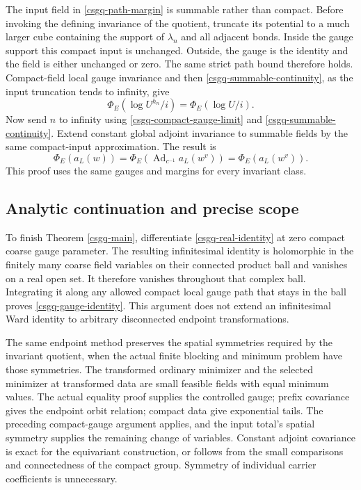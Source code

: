 The input field in \eqref{csgq-path-margin} is summable rather than
compact. Before invoking the defining invariance of the quotient,
truncate its potential to a much larger cube containing the support of
$\lambda_n$ and all adjacent bonds. Inside the gauge support this
compact input is unchanged. Outside, the gauge is the identity and
the field is either unchanged or zero. The same strict path bound
therefore holds. Compact-field local gauge invariance and then
\eqref{csgq-summable-continuity}, as the input truncation tends to
infinity, give
\begin{equation}
              \Phi_E(\log U^{h_n}/i)=\Phi_E(\log U/i).
 \label{csgq-compact-path-identity}
\end{equation}
Now send $n$ to infinity using \eqref{csgq-compact-gauge-limit} and
\eqref{csgq-summable-continuity}. Extend constant global adjoint
invariance to summable fields by the same compact-input approximation.
The result is
\begin{equation}
 \Phi_E(a_L(w))
   =\Phi_E(\operatorname{Ad}_{c^{-1}}a_L(w^v))
   =\Phi_E(a_L(w^v)).
 \label{csgq-real-identity}
\end{equation}
This proof uses the same gauges and margins for every invariant class.

\subsection{Analytic continuation and precise scope}
\label{csgq-scope-section}

To finish Theorem \ref{csgq-main}, differentiate
\eqref{csgq-real-identity} at zero compact coarse gauge parameter.
The resulting infinitesimal identity is holomorphic in the finitely
many coarse field variables on their connected product ball and
vanishes on a real open set. It therefore vanishes throughout that
complex ball. Integrating it along any allowed compact local gauge
path that stays in the ball proves \eqref{csgq-gauge-identity}.
This argument does not extend an infinitesimal Ward identity to
arbitrary disconnected endpoint transformations.

The same endpoint method preserves the spatial symmetries required
by the invariant quotient, when the actual finite blocking and
minimum problem have those symmetries. The transformed ordinary
minimizer and the selected minimizer at transformed data are small
feasible fields with equal minimum values. The actual equality proof
supplies the controlled gauge; prefix covariance gives the endpoint
orbit relation; compact data give exponential tails. The preceding
compact-gauge argument applies, and the input total's spatial symmetry
supplies the remaining change of variables. Constant adjoint covariance
is exact for the equivariant construction, or follows from the small
comparisons and connectedness of the compact group. Symmetry of
individual carrier coefficients is unnecessary.

